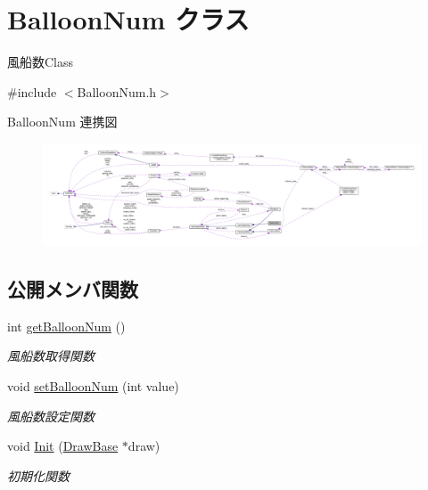 \hypertarget{class_balloon_num}{}\section{Balloon\+Num クラス}
\label{class_balloon_num}


風船数\+Class  




{\ttfamily \#include $<$Balloon\+Num.\+h$>$}



Balloon\+Num 連携図\nopagebreak
\begin{figure}[H]
\begin{center}
\leavevmode
\includegraphics[width=350pt]{class_balloon_num__coll__graph}
\end{center}
\end{figure}
\subsection*{公開メンバ関数}
\begin{DoxyCompactItemize}
\item 
int \mbox{\hyperlink{class_balloon_num_a37591e3bef6923422dc749ae380bb1e6}{get\+Balloon\+Num}} ()
\begin{DoxyCompactList}\small\item\em 風船数取得関数 \end{DoxyCompactList}\item 
void \mbox{\hyperlink{class_balloon_num_a8245a82ff0803d06024ca6695def56f0}{set\+Balloon\+Num}} (int value)
\begin{DoxyCompactList}\small\item\em 風船数設定関数 \end{DoxyCompactList}\item 
void \mbox{\hyperlink{class_balloon_num_a9754a1dcc393bdf2cb7fc7c94809ed34}{Init}} (\mbox{\hyperlink{class_draw_base}{Draw\+Base}} $\ast$draw)
\begin{DoxyCompactList}\small\item\em 初期化関数 \end{DoxyCompactList}\end{DoxyCompactItemize}

